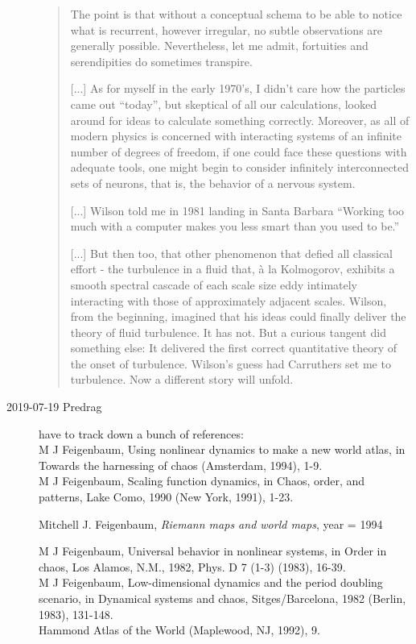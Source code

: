 \begin{description}
\begin{quote}
The point is that without a conceptual schema to be able to notice what
is recurrent, however irregular, no subtle observations are generally
possible. Nevertheless, let me admit, fortuities and serendipities do
sometimes transpire.

[...]
As for myself in the early 1970's, I didn't care how the particles came
out ``today'', but skeptical of all our calculations, looked around for
ideas to calculate something correctly. Moreover, as all of modern
physics is concerned with interacting systems of an infinite number of
degrees of freedom, if one could face these questions with adequate
tools, one might begin to consider infinitely interconnected sets of
neurons, that is, the behavior of a nervous system.

[...]
Wilson told me in 1981 landing in Santa Barbara ``Working too much with a
computer makes you less smart than you used to be.''

[...]
But then too, that other phenomenon that defied all classical effort -
the turbulence in a fluid that, à la Kolmogorov, exhibits a smooth
spectral cascade of each scale size eddy intimately interacting with
those of approximately adjacent scales. Wilson, from the beginning,
imagined that his ideas could finally deliver the theory of fluid
turbulence. It has not. But a curious tangent did something else: It
delivered the first correct quantitative theory of the onset of
turbulence. Wilson’s guess had Carruthers set me to turbulence. Now a
different story will unfold.

\end{quote}

\item[2019-07-19 Predrag]
have to track down a bunch of references:\\
 M J Feigenbaum, Using nonlinear dynamics to make a new world atlas, in Towards the harnessing of chaos (Amsterdam, 1994), 1-9.
\\
M J Feigenbaum, Scaling function dynamics, in Chaos, order, and patterns, Lake Como, 1990 (New York, 1991), 1-23.

{Mitchell J. Feigenbaum},
{\em Riemann maps and world maps},
  year      = {1994}

M J Feigenbaum, Universal behavior in nonlinear systems, in Order in chaos, Los Alamos, N.M., 1982, Phys. D 7 (1-3) (1983), 16-39.
\\
M J Feigenbaum, Low-dimensional dynamics and the period doubling scenario, in Dynamical systems and chaos, Sitges/Barcelona, 1982 (Berlin, 1983), 131-148.
\\
Hammond Atlas of the World (Maplewood, NJ, 1992), 9.

\end{description}


